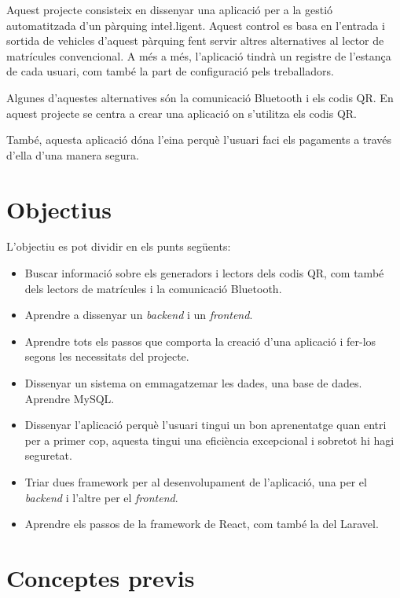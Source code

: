 
Aquest projecte consisteix en dissenyar una aplicació per a la gestió automatitzada d'un pàrquing inte\l.ligent.
Aquest control es basa en l'entrada i sortida de vehicles d'aquest pàrquing fent servir altres alternatives
al lector de matrícules convencional. A més a més, l'aplicació tindrà un registre de l'estança de cada usuari,
com també la part de configuració pels treballadors.

Algunes d'aquestes alternatives són la comunicació Bluetooth i els codis QR.
En aquest projecte se centra a crear una aplicació on s'utilitza els codis QR.

També, aquesta aplicació dóna l'eina perquè l'usuari faci els pagaments a través d'ella d'una manera segura.

\section{Objectius}

L'objectiu es pot dividir en els punts següents:

\begin{itemize}
    \item Buscar informació sobre els generadors i lectors dels codis QR, com també dels lectors de matrícules i la comunicació Bluetooth.
    \item Aprendre a dissenyar un \emph{backend} i un \emph{frontend}.
    \item Aprendre tots els passos que comporta la creació d'una aplicació i fer-los segons les necessitats del projecte.
    \item Dissenyar un sistema on emmagatzemar les dades, una base de dades. Aprendre MySQL.
    \item Dissenyar l'aplicació perquè l'usuari tingui un bon aprenentatge quan entri per a primer cop, aquesta tingui una eficiència excepcional i sobretot hi hagi seguretat.
    \item Triar dues framework per al desenvolupament de l'aplicació, una per el \emph{backend} i l'altre per el \emph{frontend}.
    \item Aprendre els passos de la framework de React, com també la del Laravel.
\end{itemize}

\section{Conceptes previs}

